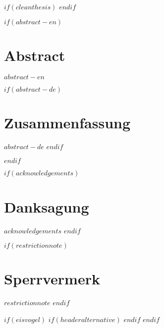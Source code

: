 
$if(cleanthesis)$
\clearpage
\customtitlebackpage
$endif$



$if(abstract-en)$
\cleardoublepage
\begin{minipage}{\linewidth}

\chapter*{Abstract}
$abstract-en$

$if(abstract-de)$
\chapter*{Zusammenfassung}
$abstract-de$
$endif$

\end{minipage}
\cleardoublepage
$endif$



$if(acknowledgements)$
\chapter*{Danksagung}
$acknowledgements$
$endif$



$if(restrictionnote)$
\chapter*{Sperrvermerk}
$restrictionnote$
$endif$



\cleardoublepage



$if(eisvogel)$
$if(headeralternative)$
    \pagestyle{headeralternative}
$endif$
$endif$
